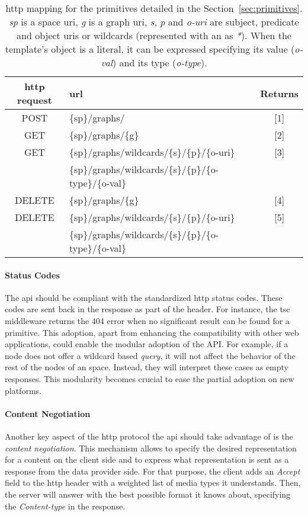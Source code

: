 \begin{table} %
  \centering
  \caption {
    \acs{http} mapping for the primitives detailed in the Section~\ref{sec:primitives}. \textit{sp} is a space \acs{uri},
    \textit{g} is a graph \acs{uri}, \textit{s}, \textit{p} and \textit{o-uri} are subject, predicate and object \acsp{uri} or wildcards (represented with an as \textit{*}).
    When the template's object is a literal, it can be expressed specifying its value (\textit{o-val}) and its type (\textit{o-type}).
    \medskip
  }
  \begin{tabular}{c|l|c}
      \acs{http} request & \acs{url} & Returns \\
      \hline
      POST & \{sp\}/graphs/ & [1] \\
      GET & \{sp\}/graphs/\{g\} & [2] \\
      GET & \{sp\}/graphs/wildcards/\{s\}/\{p\}/\{o-uri\} & [3] \\
      & \{sp\}/graphs/wildcards/\{s\}/\{p\}/\{o-type\}/\{o-val\} & \\
      DELETE & \{sp\}/graphs/\{g\} & [4] \\
      DELETE & \{sp\}/graphs/wildcards/\{s\}/\{p\}/\{o-uri\} & [5] \\
      & \{sp\}/graphs/wildcards/\{s\}/\{p\}/\{o-type\}/\{o-val\} & \\
  \end{tabular}
  \label{tab:tscAPI}
\end{table}


\paragraph{Status Codes}
\label{sec:status_codes}
The \acs{api} should be compliant with the standardized \acs{http} status codes.
These codes are sent back in the response as part of the header.
For instance, the \ac{tsc} middleware returns the 404 error when no significant result can be found for a primitive.
This adoption, apart from enhancing the compatibility with other web applications, could enable the modular adoption of the API.
For example, if a node does not offer a wildcard based \textit{query}, it will not affect the behavior of the rest of the nodes of an space.
Instead, they will interpret these cases as empty responses.
This modularity becomes crucial to ease the partial adoption on new platforms.

\paragraph{Content Negotiation}
Another key aspect of the \acs{http} protocol the \acs{api} should take advantage of is the \textit{content negotiation}.
This mechanism allows to specify the desired representation for a content on the client side and to express what representation is sent as a response from the data provider side.
For that purpose, the client adds an \textit{Accept} field to the \acs{http} header with a weighted list of media types it understands.
Then, the server will answer with the best possible format it knows about, specifying the \textit{Content-type} in the response.

